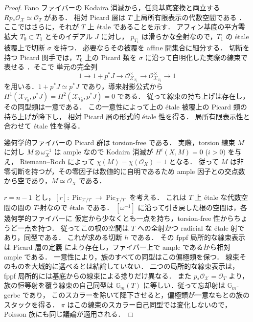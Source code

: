 \begin{proof}
Fano ファイバーの Kodaira 消滅から，任意基底変換と両立する
$Rp_*\mathcal O_{\mathcal X}\simeq\mathcal O_T$ がある．
相対 Picard 層は $T$ 上局所有限表示の代数空間である
\cite[Tags 0D2C, 0DNI]{StacksProject}．ここではさらに，それが $T$ 上 \'{e}tale であることを示す．
アフィン基底の平方零拡大 $T_0\subset T_1$ とそのイデアル $J$ に対し，
$p_{T_1}$ は滑らかな全射なので，$T_1$ の \'{e}tale 被覆上で切断 $\sigma$ を持つ．
必要ならその被覆を affine 開集合に細分する．
切断を持つ Picard 関手では，$T_0$ 上の Picard 類を
$\sigma$ に沿って自明化した実際の線束で表せる
\cite[Tag 0D28]{StacksProject}．そこで
単元の完全列
\[
 1\longrightarrow1+p^*J\longrightarrow
 \mathcal O_{\mathcal X_{T_1}}^\times\longrightarrow
 \mathcal O_{\mathcal X_{T_0}}^\times\longrightarrow1
\]
を用いる．$1+p^*J\simeq p^*J$ であり，導来射影公式から
$H^1(\mathcal X_{T_0},p^*J)=H^2(\mathcal X_{T_0},p^*J)=0$ である．
従って線束の持ち上げは存在し，その同型類は一意である．
この一意性によって上の \'{e}tale 被覆上の Picard 類の持ち上げが降下し，
相対 Picard 層の形式的 \'{e}tale 性を得る．
局所有限表示性と合わせて \'{e}tale 性を得る．

幾何学的ファイバーの Picard 群は torsion-free である．
実際，torsion 線束 $M$ に対し $M\otimes\omega_X^{-1}$ は ample なので
Kodaira 消滅が $H^i(X,M)=0$ ($i>0$) を与え，
Riemann--Roch によって $\chi(M)=\chi(\mathcal O_X)=1$ となる．
従って $M$ は非零切断を持つが，その零因子は数値的に自明であるため
ample 因子との交点数から空であり，$M\simeq\mathcal O_X$ である．

$r=n-1$ とし，$[r]:\operatorname{Pic}_{\mathcal X/T}\to
\operatorname{Pic}_{\mathcal X/T}$ を考える．
これは $T$ 上 \'{e}tale な代数空間の間の $T$-射なので \'{e}tale である．
$[\omega^{-1}]$ に沿って引き戻した根の空間は，各幾何学的ファイバーに
仮定から少なくとも一点を持ち，torsion-free 性からちょうど一点を持つ．
従ってこの根の空間は $T$ への全射かつ radicial な \'{e}tale 射であり，同型である．
これが求める切断 $h$ である．
その fppf 局所的な線束表示は Picard 層の定義
\cite[Tag 0DME]{StacksProject} により存在し，ファイバー上で ample であるから相対 ample である．
一意性により，族のすべての同型はこの偏極類を保つ．
線束そのものを大域的に選べるとは結論していない．
二つの局所的な線束表示は，fppf 局所的には基底からの線束による捻りだけ異なる．
また $p_*\mathcal O_{\mathcal X}=\mathcal O_T$ より，族の恒等射を覆う線束の自己同型は
$\mathbb G_m(T)$ に等しい．従って忘却射は $\mathbb G_m$-gerbe であり，
このスカラーを除いて降下させると，偏極類が一意なもとの族のスタックを得る．
$\pi$ はこの線束のスカラー自己同型では変化しないので，Poisson 族にも同じ議論が適用される．
\end{proof}

